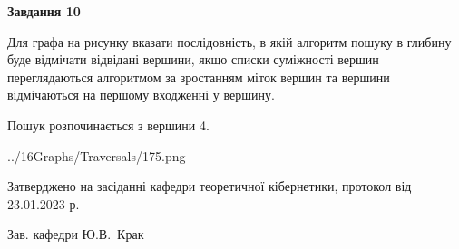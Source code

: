 \documentclass[12pt, ukrainian]{article}
\begin{document}
{\begin {large}
{\begin {center}\textbf{Завдання 10}\end {center}}\par
Для графа на рисунку вказати послідовність, в якій алгоритм пошуку в глибину буде відмічати відвідані вершини, якщо списки суміжності вершин переглядаються алгоритмом за зростанням міток вершин та вершини відмічаються на першому вход\-женні у вершину.\par
Пошук розпочинається з вершини 4.\par

\begin{center}
	{../16Graphs/Traversals/175.png}
\end{center}\par
\newpage


\end {large}
}
{\smallskip \begin {small} Затверджено на засіданні кафедри теоретичної кібернетики, протокол  від   23.01.2023 р.\par\smallskip\smallskip
{\parbox {6.5 cm}{Зав. кафедри \dotfill Ю.В.~Крак}} \end{small}}
\end{document}
